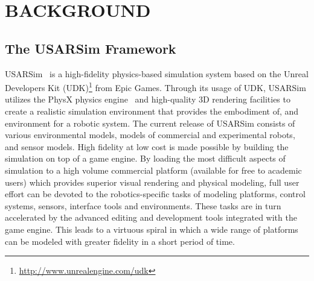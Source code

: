 \section*{BACKGROUND}

\subsection*{The USARSim Framework}
USARSim~\cite{CARPIN.LNAI.2006} is a high-fidelity physics-based simulation system based on the Unreal Developers Kit (UDK)\footnote{\url{http://www.unrealengine.com/udk}} from Epic Games. 
Through its usage of UDK, USARSim utilizes the PhysX physics engine~\cite{boeing2007evaluation}
and high-quality 3D rendering facilities to create a realistic simulation environment that provides the embodiment of, and environment for a robotic
system. The current release of USARSim consists of various environmental models, models of commercial and experimental robots, and sensor models. High fidelity at low cost is made possible by building the simulation on top of a game engine. By loading the most
difficult aspects of simulation to a high volume commercial platform (available for free to academic users) which provides superior visual rendering and physical modeling, full user effort can be devoted to the robotics-specific tasks of modeling platforms, control systems, sensors, interface tools and environments. These tasks are in turn accelerated by the advanced editing and development tools integrated with the game engine. This leads to a virtuous spiral in which a wide range of platforms can be modeled with greater fidelity in a short period of time.


